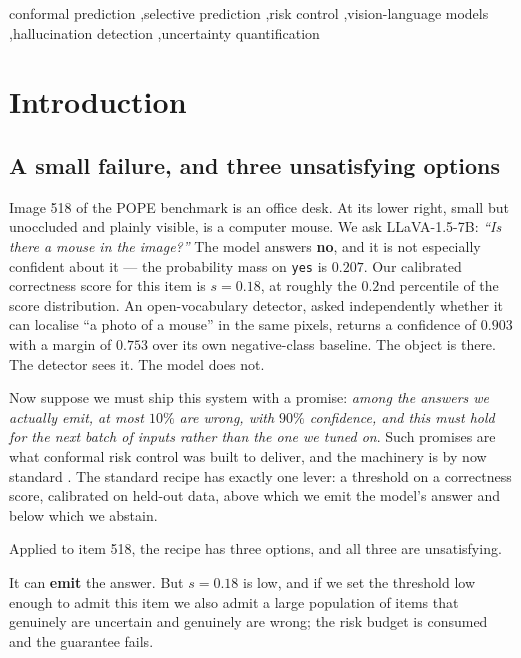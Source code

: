 \documentclass[review,number,doubleblind]{elsarticle}
\theoremstyle{plain}
\theoremstyle{definition}
\theoremstyle{remark}
\begin{document}
\begin{frontmatter}
\begin{keyword}
conformal prediction \sep selective prediction \sep risk control \sep vision-language models \sep hallucination detection \sep uncertainty quantification
\end{keyword}

\end{frontmatter}

\section{Introduction}
\label{sec:intro}

\subsection{A small failure, and three unsatisfying options}

Image 518 of the POPE benchmark is an office desk. At its lower right, small but unoccluded and
plainly visible, is a computer mouse. We ask LLaVA-1.5-7B: \emph{``Is
there a mouse in the image?''} The model answers \textbf{no}, and it is not especially
confident about it --- the probability mass on \texttt{yes} is $0.207$. Our calibrated
correctness score for this item is $s=0.18$, at roughly the $0.2$nd percentile of the score distribution. An
open-vocabulary detector, asked independently whether it can localise ``a photo of a
mouse'' in the same pixels, returns a confidence of $0.903$ with a margin of $0.753$ over
its own negative-class baseline. The object is there. The detector sees it. The model
does not.

Now suppose we must ship this system with a promise: \emph{among the answers we actually
emit, at most $10\%$ are wrong, with $90\%$ confidence, and this must hold for the next
batch of inputs rather than the one we tuned on}. Such promises are what conformal risk
control was built to deliver, and the machinery is by now standard
\citep{vovk2005,bates2021rcps,angelopoulos2021ltt}. The standard recipe has exactly one
lever: a threshold on a correctness score, calibrated on held-out data, above which we
emit the model's answer and below which we abstain.

Applied to item 518, the recipe has three options, and all three are unsatisfying.

It can \textbf{emit} the answer. But $s=0.18$ is low, and if we set the threshold low
enough to admit this item we also admit a large population of items that genuinely are
uncertain and genuinely are wrong; the risk budget is consumed and the guarantee fails.
\end{document}
